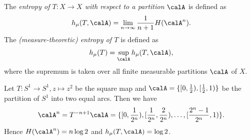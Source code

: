 
  \begin{definition}
    The \emph{entropy of $T: X \to X$ with respect to a partition $\calA$} is defined as
    \[ h_\mu(T, \calA) = \lim_{n \to \infty} \frac{1}{n+1} H(\calA^n). \]
    The \emph{(measure-theoretic) entropy of $T$} is defined as
    \[ h_\mu(T) = \sup_{\calA} h_\mu(T, \calA), \]
    where the supremum is taken over all finite measurable partitions $\calA$ of $X$.    
  \end{definition}

  \begin{example}
    Let $T: S^1 \to S^1, z \mapsto z^2$ be the square map and $\calA = \{[0, \frac{1}{2}), [\frac{1}{2}, 1)\}$ be the partition of $S^1$ into two equal arcs.
    Then we have 
    \[ \calA^n = T^{-n+1} \calA = \{[0, \frac{1}{2^n}), [\frac{1}{2^n}, \frac{2}{2^n}), \ldots, [\frac{2^n-1}{2^n}, 1)\}. \]
    Hence $H(\calA^n) = n \log 2$ and $h_\mu(T, \calA) = \log 2$.
  \end{example}

